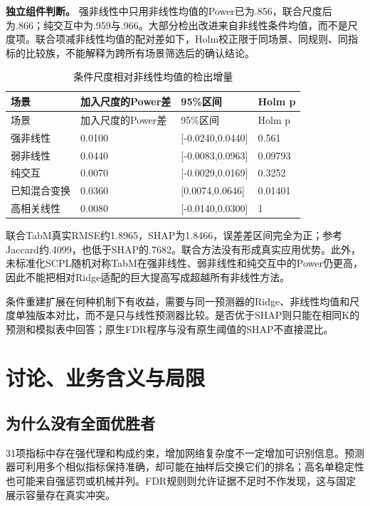 \documentclass{sufethesismas}
\begin{document}
\textbf{独立组件判断。} 强非线性中只用非线性均值的Power已为.856，联合尺度后为.866；纯交互中为.959与.966。大部分检出改进来自非线性条件均值，而不是尺度项。联合项减非线性均值的配对差如下，Holm校正限于同场景、同规则、同指标的比较族，不能解释为跨所有场景筛选后的确认结论。

{
\footnotesize
\begin{longtable}[]{@{}llll@{}}
\caption{条件尺度相对非线性均值的检出增量}\tabularnewline
\toprule\noalign{}
场景 & 加入尺度的Power差 & 95\%区间 & Holm p \\
\midrule\noalign{}
\endfirsthead
\toprule\noalign{}
场景 & 加入尺度的Power差 & 95\%区间 & Holm p \\
\midrule\noalign{}
\endhead
\bottomrule\noalign{}
\endlastfoot
强非线性 & 0.0100 & {[}-0.0240,0.0440{]} & 0.561 \\
弱非线性 & 0.0440 & {[}-0.0083,0.0963{]} & 0.09793 \\
纯交互 & 0.0070 & {[}-0.0029,0.0169{]} & 0.3252 \\
已知混合变换 & 0.0360 & {[}0.0074,0.0646{]} & 0.01401 \\
高相关线性 & 0.0080 & {[}-0.0140,0.0300{]} & 1 \\
\end{longtable}
}

联合TabM真实RMSE约1.8965，SHAP为1.8466，误差差区间完全为正；参考Jaccard约.4099，也低于SHAP的.7682。联合方法没有形成真实应用优势。此外，未标准化SCPL随机对称TabM在强非线性、弱非线性和纯交互中的Power仍更高，因此不能把相对Ridge适配的巨大提高写成超越所有非线性方法。

条件重建扩展在何种机制下有收益，需要与同一预测器的Ridge、非线性均值和尺度单独版本对比，而不是只与线性预测器比较。是否优于SHAP则只能在相同K的预测和模拟表中回答；原生FDR程序与没有原生阈值的SHAP不直接混比。

\chapter{讨论、业务含义与局限}

\section{为什么没有全面优胜者}

31项指标中存在强代理和构成约束，增加网络复杂度不一定增加可识别信息。预测器可利用多个相似指标保持准确，却可能在抽样后交换它们的排名；高名单稳定性也可能来自强惩罚或机械并列。FDR规则则允许证据不足时不作发现，这与固定展示容量存在真实冲突。
\end{document}

